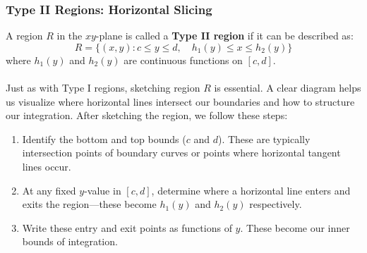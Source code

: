 \subsubsection*{Type II Regions: Horizontal Slicing} 

\noindent A region $R$ in the $xy$-plane is called a \textbf{Type II region} if it can be described as:
\[
R = \{(x,y) : c \leq y \leq d, \quad h_1(y) \leq x \leq h_2(y)\}
\]
where $h_1(y)$ and $h_2(y)$ are continuous functions on $[c,d]$. \\ \\
\noindent Just as with Type I regions, sketching region $R$ is essential. A clear diagram helps us visualize where horizontal lines intersect our boundaries and how to structure our integration. After sketching the region, we follow these steps:

\begin{enumerate}
    \item Identify the bottom and top bounds ($c$ and $d$). These are typically intersection points of boundary curves or points where horizontal tangent lines occur.
    
    \item At any fixed $y$-value in $[c,d]$, determine where a horizontal line enters and exits the region—these become $h_1(y)$ and $h_2(y)$ respectively.
    
    \item Write these entry and exit points as functions of $y$. These become our inner bounds of integration.
\end{enumerate}


